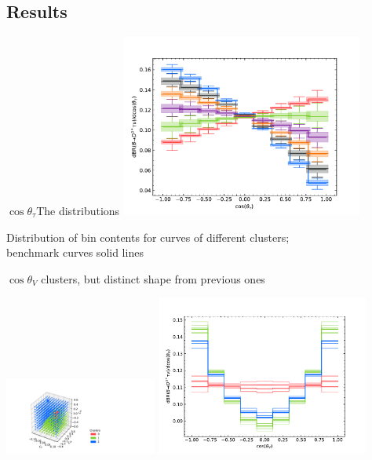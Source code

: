 \subsection{Results}
%
\begin{frame}{$\cos\theta_\tau$}{The distributions}
	\centering
	\includegraphics[width=8cm, clip, trim=1cm 0.75cm 1cm 1cm]{figures/from-paper/cosl_box.pdf}
	
	Distribution of bin contents for curves of different clusters;\\
	benchmark curves solid lines 
	
\end{frame}
%
\begin{frame}{$\cos\theta_V$}
	 clusters, but distinct shape from previous ones
	\begin{changemargin}{-1cm}{-1cm}
		{\includegraphics[width=5cm,clip,trim=3cm 0.3cm 7.5cm 1cm]{figures/from-paper/cosV_3D.pdf}}
		{\includegraphics[width=7cm,clip,trim=0.3cm 0.cm 1.5cm 0cm]{figures/from-paper/cosV_dist.pdf}}
	\end{changemargin}
\end{frame}

